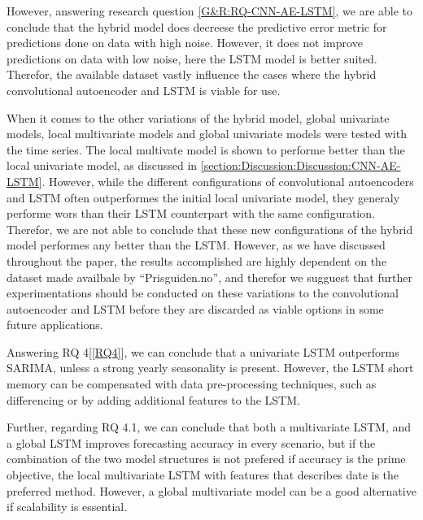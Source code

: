 However, answering research question \cref{G&R:RQ-CNN-AE-LSTM}, we are able to conclude that the hybrid model does
decreese the predictive error metric for predictions done on data with high noise.
However, it does not improve predictions on data with low noise, here the LSTM model is better suited.
Therefor, the available dataset vastly influence the cases where the hybrid convolutional autoencoder and LSTM is viable for use.

When it comes to the other variations of the hybrid model, global univariate models,
local multivariate models and global univariate models were tested with the time series.
The local multivate model is shown to performe better than the local univariate model, as discussed in \cref{section:Discussion:Discussion:CNN-AE-LSTM}.
However, while the different configurations of convolutional autoencoders and LSTM often outperformes the initial local univariate model,
they generaly performe wors than their LSTM counterpart with the same configuration.
Therefor, we are not able to conclude that these new configurations of the hybrid model performes any better than the LSTM.
However, as we have discussed throughout the paper, the results accomplished are highly dependent on the dataset made availbale by ``Prisguiden.no'',
and therefor we sugguest that further experimentations should be conducted on these variations to the convolutional autoencoder and LSTM
before they are discarded as viable options in some future applications.



Answering RQ 4[\ref{RQ4}], we can conclude that a univariate LSTM outperforms SARIMA,
unless a strong yearly seasonality is present. However, the LSTM short memory can be
compensated with data pre-processing techniques, such as differencing or by adding
additional features to the LSTM.

Further, regarding RQ 4.1, we can conclude that both a multivariate LSTM,
and a global LSTM improves forecasting accuracy in every scenario, but if the combination
of the two model structures is not prefered if accuracy is the prime objective,
the local multivariate LSTM with features that describes date is the preferred method.
However, a global multivariate model can be a good alternative if scalability is essential.

